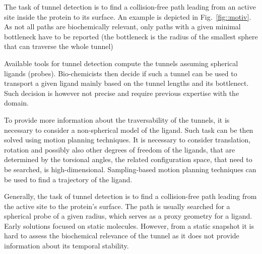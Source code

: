 \documentclass{llncs}
\begin{document}
The task of tunnel detection is to find a collision-free path leading from an active site inside the protein to its surface.
An example is depicted in Fig.~\ref{fig::motiv}.
As not all paths are biochemically relevant, only paths with a given minimal bottleneck have to be reported (the bottleneck is
the radius of the smallest sphere that can traverse the whole tunnel) 

Available tools for tunnel detection compute the tunnels assuming spherical ligands (probes). 
Bio-chemicists then decide if such a tunnel can be used to transport a given ligand mainly based on the tunnel
lengths and its bottlenect.
Such decision is however not precise and require previous expertise with the domain.

To provide more information about the traversability of the tunnels, it is necessary to consider a non-spherical model of 
the ligand.
Such task can be then solved using motion planning techniques.
It is necessary to consider translation, rotation and possibly also other degrees of freedom of the ligands, that are determined
by the torsional angles, the related configuration space, that need to be searched, is high-dimensional. 
Sampling-based motion planning techniques can be used to find a trajectory of the ligand.

Generally, the task of tunnel detection is to find a collision-free path leading from the active site to the protein's surface. 
The path is usually searched for a spherical probe of a given radius, which serves as a proxy geometry for a ligand. 
Early solutions focused on static molecules. 
However, from a static snapshot it is hard to assess the biochemical relevance of the tunnel as it does not
provide information about its temporal stability. 
\end{document}

